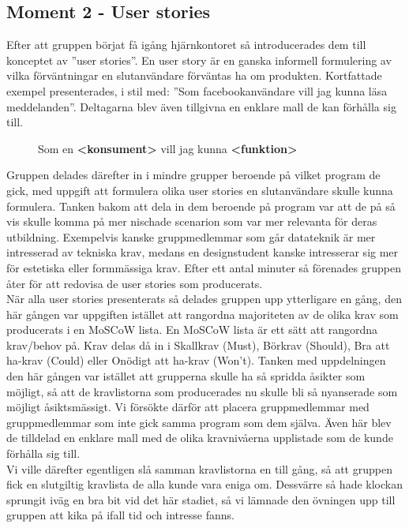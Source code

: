 \documentclass[a4paper, titlepage,12pt]{article}
\begin{document}
		\subsection{Moment 2 - User stories}
			Efter att gruppen börjat få igång hjärnkontoret så introducerades dem till konceptet av ''user stories''. En user story är en ganska informell formulering av vilka förväntningar en slutanvändare förväntas ha om produkten. Kortfattade exempel presenterades, i stil med: ''Som facebookanvändare vill jag kunna läsa meddelanden''. Deltagarna blev även tillgivna en enklare mall de kan förhålla sig till.

			\begin{figure}[h!]
				\begin{center}
				Som en \textbf{<konsument>} vill jag kunna \textbf{<funktion>}
				\end{center}
			\end{figure}

			Gruppen delades därefter in i mindre grupper beroende på vilket program de gick, med uppgift att formulera olika user stories en slutanvändare skulle kunna formulera. Tanken bakom att dela in dem beroende på program var att de på så vis skulle komma på mer nischade scenarion som var mer relevanta för deras utbildning. Exempelvis kanske gruppmedlemmar som går datateknik är mer intresserad av tekniska krav, medans en designstudent kanske intresserar sig mer för estetiska eller formmässiga krav. Efter ett antal minuter så förenades gruppen åter för att redovisa de user stories som producerats.\\

			När alla user stories presenterats så delades gruppen upp ytterligare en gång, den här gången var uppgiften istället att rangordna majoriteten av de olika krav som producerats i en MoSCoW lista. En MoSCoW lista är ett sätt att rangordna krav/behov på. Krav delas då in i Skallkrav (Must), Börkrav (Should), Bra att ha-krav (Could) eller Onödigt att ha-krav (Won't). Tanken med uppdelningen den här gången var istället att grupperna skulle ha så spridda åsikter som möjligt, så att de kravlistorna som producerades nu skulle bli så nyanserade som möjligt åsiktsmässigt. Vi försökte därför att placera gruppmedlemmar med gruppmedlemmar som inte gick samma program som dem själva. Även här blev de tilldelad en enklare mall med de olika kravnivåerna upplistade som de kunde förhålla sig till.\\

			Vi ville därefter egentligen slå samman kravlistorna en till gång, så att gruppen fick en slutgiltig kravlista de alla kunde vara eniga om. Dessvärre så hade klockan sprungit iväg en bra bit vid det här stadiet, så vi lämnade den övningen upp till gruppen att kika på ifall tid och intresse fanns.
\end{document}
